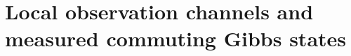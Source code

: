\section{Local observation channels and measured commuting Gibbs states}
\label{sec:resolution-structure}





